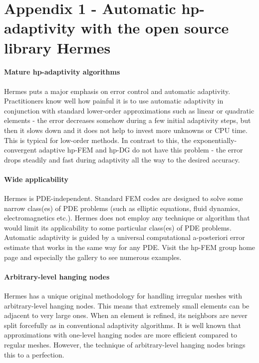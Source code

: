 \section{Appendix 1 - Automatic hp-adaptivity with the open source library Hermes}

\paragraph{Mature hp-adaptivity algorithms}
Hermes puts a major emphasis on error control and automatic adaptivity. Practitioners know well how painful it is to use automatic adaptivity in conjunction with standard lower-order approximations such as linear or quadratic elements - the error decreases somehow during a few initial adaptivity steps, but then it slows down and it does not help to invest more unknowns or CPU time. This is typical for low-order methods. In contrast to this, the exponentially-convergent adaptive hp-FEM and hp-DG do not have this problem - the error drops steadily and fast during adaptivity all the way to the desired accuracy.

\paragraph{Wide applicability}
Hermes is PDE-independent. Standard FEM codes are designed to solve some narrow class(es) of PDE problems (such as elliptic equations, fluid dynamics, electromagnetics etc.). Hermes does not employ any technique or algorithm that would limit its applicability to some particular class(es) of PDE problems. Automatic adaptivity is guided by a universal computational a-posteriori error estimate that works in the same way for any PDE. Visit the hp-FEM group home page and especially the gallery to see numerous examples.

\paragraph{Arbitrary-level hanging nodes}
Hermes has a unique original methodology for handling irregular meshes with arbitrary-level hanging nodes. This means that extremely small elements can be adjacent to very large ones. When an element is refined, its neighbors are never split forcefully as in conventional adaptivity algorithms. It is well known that approximations with one-level hanging nodes are more efficient compared to regular meshes. However, the technique of arbitrary-level hanging nodes brings this to a perfection.


